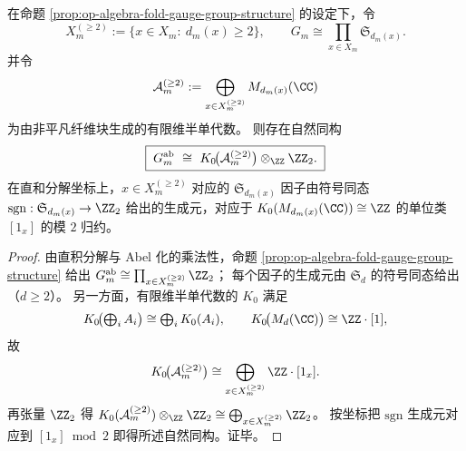 \begin{corollary}\label{cor:op-algebra-fold-gauge-ab-k0-mod2}
在命题 \ref{prop:op-algebra-fold-gauge-group-structure} 的设定下，令
\[
X_m^{(\ge 2)}:=\{x\in X_m:\ d_m(x)\ge 2\},
\qquad
G_m\cong\prod_{x\in X_m}\mathfrak S_{d_m(x)}.
\]
并令
\[
\mathcal{A}_m^{(\ge 2)}:=\bigoplus_{x\in X_m^{(\ge 2)}} M_{d_m(x)}(\CC)
\]
为由非平凡纤维块生成的有限维半单代数。
则存在自然同构
\[
\boxed{\;
G_m^{\mathrm{ab}}\ \cong\ K_0\!\bigl(\mathcal{A}_m^{(\ge 2)}\bigr)\otimes_{\ZZ}\ZZ_2.\;}
\]
在直和分解坐标上，\(x\in X_m^{(\ge 2)}\) 对应的 \(\mathfrak S_{d_m(x)}\) 因子由符号同态
\(\mathrm{sgn}:\mathfrak S_{d_m(x)}\to\ZZ_2\)
给出的生成元，对应于 \(K_0(M_{d_m(x)}(\CC))\cong\ZZ\) 的单位类 \([1_x]\) 的模 \(2\) 归约。
\end{corollary}
\begin{proof}
由直积分解与 Abel 化的乘法性，命题 \ref{prop:op-algebra-fold-gauge-group-structure} 给出
\(
G_m^{\mathrm{ab}}\cong \prod_{x\in X_m^{(\ge 2)}}\ZZ_2
\)；
每个因子的生成元由 \(\mathfrak S_{d}\) 的符号同态给出（\(d\ge 2\)）。
另一方面，有限维半单代数的 \(K_0\) 满足
\[
K_0\!\bigl(\textstyle\bigoplus_i A_i\bigr)\cong \bigoplus_i K_0(A_i),
\qquad
K_0\!\bigl(M_d(\CC)\bigr)\cong \ZZ\cdot [1],
\]
故
\[
K_0\!\bigl(\mathcal{A}_m^{(\ge 2)}\bigr)
\cong \bigoplus_{x\in X_m^{(\ge 2)}}\ZZ\cdot[1_x].
\]
再张量 \(\ZZ_2\) 得
\(
K_0(\mathcal{A}_m^{(\ge 2)})\otimes_{\ZZ}\ZZ_2\cong \bigoplus_{x\in X_m^{(\ge 2)}}\ZZ_2
\)。
按坐标把 \(\mathrm{sgn}\) 生成元对应到 \([1_x]\bmod 2\) 即得所述自然同构。证毕。
\end{proof}
